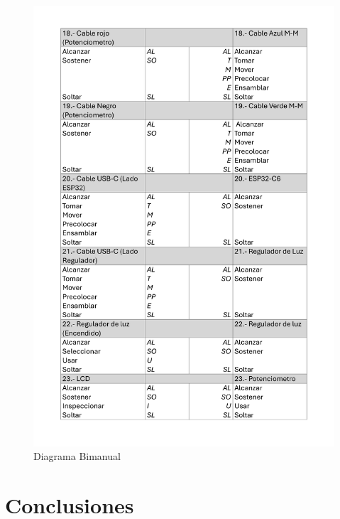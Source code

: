     \begin{figure}[H]
        \centering
        \includegraphics[scale=0.25]{30/img/diagramaBimanualEnsamble-4.pdf}
        \caption{Diagrama Bimanual}
    \end{figure}
    \section{Conclusiones}
    
